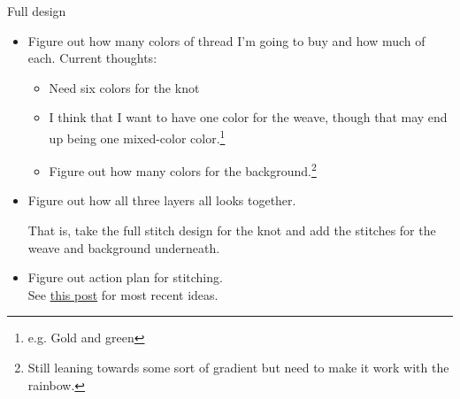 
				\item Full design
				\begin{itemize}
					\item Figure out how many colors of thread I'm going to buy and how much of each. Current thoughts:
					\begin{itemize}  
						\item Need six colors for the knot  
						\item I think that I want to have one color for the weave, though that may end up being one mixed-color color.\footnote{e.g. Gold and green}  
						\item Figure out how many colors for the background.\footnote{Still leaning towards some sort of gradient but need to make it work with the rainbow.} 
					\end{itemize}
					\item Figure out how all three layers all looks together.

					That is, take the full stitch design for the knot and add the stitches for the weave and background underneath.
					\item Figure out action plan for stitching. \\ See \href{daily-reflection-2026-08-03}{this post} for most recent ideas.
				\end{itemize}
